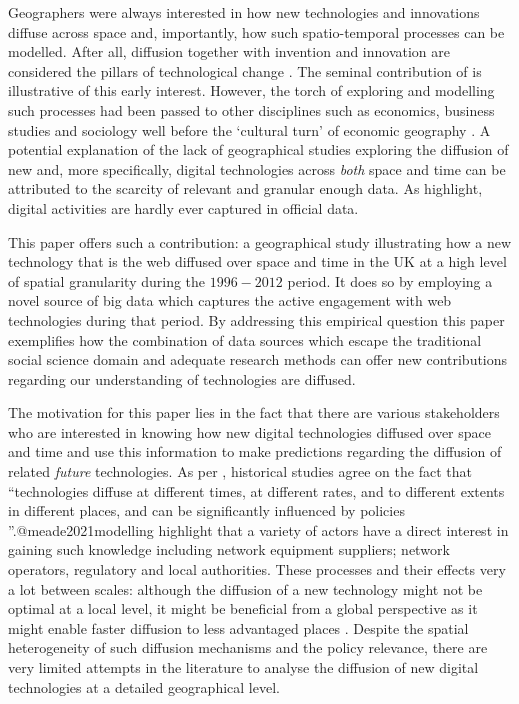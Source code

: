 \documentclass[
  authoryear,
  preprint,
  3p]{elsarticle}
\begin{document}
Geographers were always interested in how new technologies and
innovations diffuse across space and, importantly, how such
spatio-temporal processes can be modelled. After all, diffusion together
with invention and innovation are considered the pillars of
technological change \citep{das2022diffusion}. The seminal contribution
of \citet{hagerstrand1968innovation} is illustrative of this early
interest. However, the torch of exploring and modelling such processes
had been passed to other disciplines such as economics, business studies
and sociology well before the `cultural turn' of economic geography
\citep{perkins2005international}. A potential explanation of the lack of
geographical studies exploring the diffusion of new and, more
specifically, digital technologies across \emph{both} space and time can
be attributed to the scarcity of relevant and granular enough data. As
\citet{zook2022mapping} highlight, digital activities are hardly ever
captured in official data.

This paper offers such a contribution: a geographical study illustrating
how a new technology that is the web diffused over space and time in the
UK at a high level of spatial granularity during the \(1996-2012\)
period. It does so by employing a novel source of big data which
captures the active engagement with web technologies during that period.
By addressing this empirical question this paper exemplifies how the
combination of data sources which escape the traditional social science
domain and adequate research methods can offer new contributions
regarding our understanding of technologies are diffused.

The motivation for this paper lies in the fact that there are various
stakeholders who are interested in knowing how new digital technologies
diffused over space and time and use this information to make
predictions regarding the diffusion of related \emph{future}
technologies. As per \citet{leibowicz2016representing}, historical
studies agree on the fact that ``technologies diffuse at different
times, at different rates, and to different extents in different places,
and can be significantly influenced by policies
\citep{victor1993}''.@meade2021modelling highlight that a variety of
actors have a direct interest in gaining such knowledge including
network equipment suppliers; network operators, regulatory and local
authorities. These processes and their effects very a lot between
scales: although the diffusion of a new technology might not be optimal
at a local level, it might be beneficial from a global perspective as it
might enable faster diffusion to less advantaged places
\citet{leibowicz2016representing}. Despite the spatial heterogeneity of
such diffusion mechanisms and the policy relevance, there are very
limited attempts in the literature to analyse the diffusion of new
digital technologies at a detailed geographical level.
\end{document}
